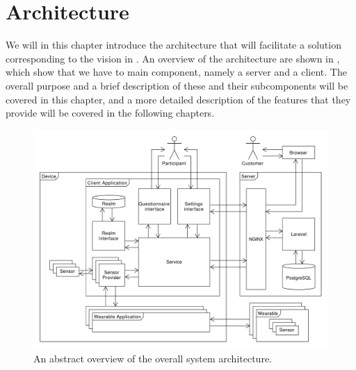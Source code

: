 
\chapter{Architecture}
\label{cha:architecture}


We will in this chapter introduce the architecture that will facilitate a solution corresponding to the vision in . An overview of the architecture are shown in , which show that we have to main component, namely a server and a client. The overall purpose and a brief description of these and their subcomponents will be covered in this chapter, and a more detailed description of the features that they provide will be covered in the following chapters.

\begin{figure}[!htbp]
    \centering
    \includegraphics[width=\textwidth]{graphic/architecture/architecture.pdf}
    \caption{An abstract overview of the overall system architecture.}
    \label{fig:system_architecture}
\end{figure}
\FloatBarrier


